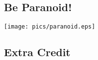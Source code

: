 \documentclass[xga]{xdvislides}
\begin{document}
%
%
%
%
%
\subsection{Be Paranoid!}
\begin{center}
	\texttt{[image: pics/paranoid.eps]}
\end{center}

\subsection{Extra Credit}
\end{document}
